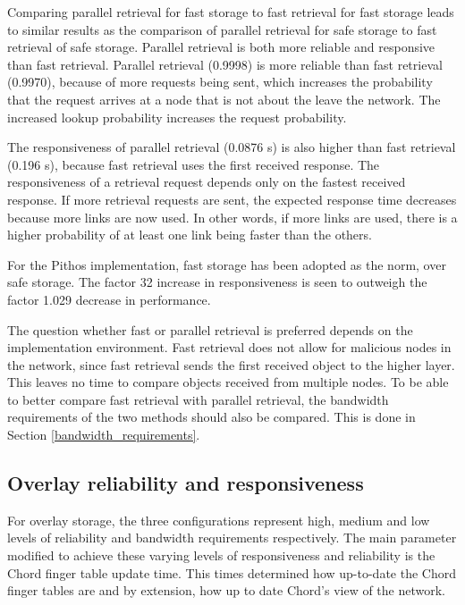Comparing parallel retrieval for fast storage to fast retrieval for fast storage leads to similar results as the comparison of parallel retrieval for safe storage to fast retrieval of safe storage. Parallel retrieval is both more reliable and responsive than fast retrieval. Parallel retrieval (0.9998) is more reliable than fast retrieval (0.9970), because of more requests being sent, which increases the probability that the request arrives at a node that is not about the leave the network. The increased lookup probability increases the request probability.

The responsiveness of parallel retrieval (0.0876 s) is also higher than fast retrieval (0.196 s), because fast retrieval uses the first received response. The responsiveness of a retrieval request depends only on the fastest received response. If more retrieval requests are sent, the expected response time decreases because more links are now used. In other words, if more links are used, there is a higher probability of at least one link being faster than the others.

For the Pithos implementation, fast storage has been adopted as the norm, over safe storage. The factor 32 increase in responsiveness is seen to outweigh the factor 1.029 decrease in performance.

The question whether fast or parallel retrieval is preferred depends on the implementation environment. Fast retrieval does not allow for malicious nodes in the network, since fast retrieval sends the first received object to the higher layer. This leaves no time to compare objects received from multiple nodes. To be able to better compare fast retrieval with parallel retrieval, the bandwidth requirements of the two methods should also be compared. This is done in Section \ref{bandwidth_requirements}.

\subsection{Overlay reliability and responsiveness}
\label{overlay_resp_rel_results}

For overlay storage, the three configurations represent high, medium and low levels of reliability and bandwidth requirements respectively. The main parameter modified to achieve these varying levels of responsiveness and reliability is the Chord finger table update time. This times determined how up-to-date the Chord finger tables are and by extension, how up to date Chord's view of the network.

